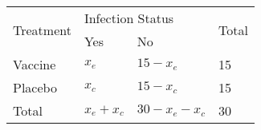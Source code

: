 \begin{table}[H]
	\centering
	\begin{tabular}{|l|l|l|l|}
		\hline
		\multirow{2}{*}{Treatment} & \multicolumn{2}{l|}{Infection Status} & \multirow{2}{*}{Total} \\ \cline{2-3}
		& Yes             & No                  &                        \\ \hline
		Vaccine                    & $x_e$           & $15 - x_e$          & 15                     \\ \hline
		Placebo                    & $x_c$           & $15 - x_c$          & 15                     \\ \hline
		Total                      & $x_e + x_c$     & $30 - x_e -x_c$     & 30                     \\ \hline
	\end{tabular}
\end{table}